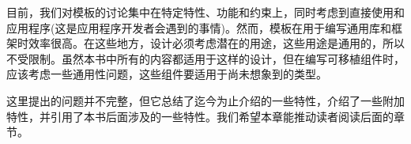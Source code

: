 目前，我们对模板的讨论集中在特定特性、功能和约束上，同时考虑到直接使用和应用程序(这是应用程序开发者会遇到的事情)。然而，模板在用于编写通用库和框架时效率很高。在这些地方，设计必须考虑潜在的用途，这些用途是通用的，所以不受限制。虽然本书中所有的内容都适用于这样的设计，但在编写可移植组件时，应该考虑一些通用性问题，这些组件要适用于尚未想象到的类型。

这里提出的问题并不完整，但它总结了迄今为止介绍的一些特性，介绍了一些附加特性，并引用了本书后面涉及的一些特性。我们希望本章能推动读者阅读后面的章节。